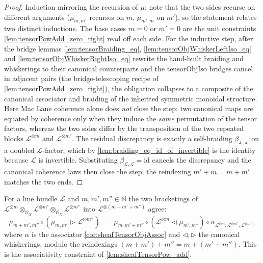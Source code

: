 \begin{proof}
  Induction mirroring the recursion of \(\mu\); note that the two sides recurse on
  different arguments (\(\mu_{m,m'}\) recurses on \(m\), \(\mu_{m',m}\) on \(m'\)),
  so the statement relates two distinct inductions. The base cases \(m = 0\) or
  \(m' = 0\) are the unit constraints \cref{lem:tensorPowAdd_zero_right} read off
  each side. For the inductive step, after the bridge lemmas
  \cref{lem:tensorBraiding_eq}, \cref{lem:tensorObjWhiskerLeftIso_eq} and
  \cref{lem:tensorObjWhiskerRightIso_eq} rewrite the hand-built braiding and
  whiskerings to their canonical counterparts and the \(\mathrm{tensorObjIso}\)
  bridges cancel in adjacent pairs (the bridge-telescoping recipe of
  \cref{lem:tensorPowAdd_zero_right}), the obligation collapses to a composite of
  the canonical associator and braiding of the inherited symmetric monoidal
  structure. Here Mac Lane coherence alone does \emph{not} close the step: two
  canonical maps are equated by coherence only when they induce the \emph{same}
  permutation of the tensor factors, whereas the two sides differ by the
  transposition of the two repeated blocks \(\mathcal{L}^{\otimes m}\) and
  \(\mathcal{L}^{\otimes m'}\). The residual discrepancy is exactly a self-braiding
  \(\beta_{\mathcal{L},\mathcal{L}}\) on a doubled \(\mathcal{L}\)-factor, which by
  \cref{lem:braiding_eq_id_of_invertible} is the identity because \(\mathcal{L}\)
  is invertible. Substituting \(\beta_{\mathcal{L},\mathcal{L}} = \mathrm{id}\)
  cancels the discrepancy and the canonical coherence laws then close the step; the
  reindexing \(m' + m = m + m'\) matches the two ends.
\end{proof}

\begin{lemma}

  \label{lem:tensorPowAdd_assoc}
  For a line bundle \(\mathcal{L}\) and \(m, m', m'' \in \mathbb{N}\) the two
  bracketings of
  \(\mathcal{L}^{\otimes m} \otimes_{\mathcal{O}_X} \mathcal{L}^{\otimes m'}
  \otimes_{\mathcal{O}_X} \mathcal{L}^{\otimes m''}\) into
  \(\mathcal{L}^{\otimes (m+m'+m'')}\) agree:
  \[
    \mu_{m+m', m''} \circ (\mu_{m,m'} \rhd \mathcal{L}^{\otimes m''})
      \;=\;
    \mu_{m, m'+m''} \circ (\mathcal{L}^{\otimes m} \lhd \mu_{m',m''})
      \circ \alpha_{\mathcal{L}^{\otimes m}, \mathcal{L}^{\otimes m'},
        \mathcal{L}^{\otimes m''}},
  \]
  where \(\alpha\) is the associator \cref{cor:sheafTensorObjAssoc} and \(\lhd,
  \rhd\) the canonical whiskerings, modulo the reindexings
  \((m+m')+m'' = m+(m'+m'')\). This is the associativity constraint of
  \cref{lem:sheafTensorPow_add}.
\end{lemma}

